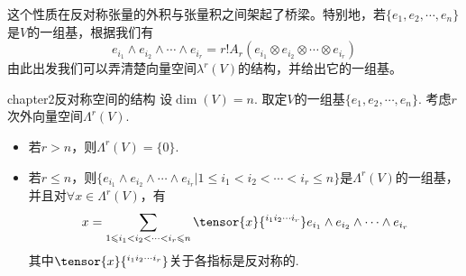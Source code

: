 这个性质在反对称张量的外积与张量积之间架起了桥梁。特别地，若$\{e_{1} ,e_{2},\cdots,e_{n}\}$是$V$的一组基，根据我们有
\begin{equation}
	e_{i_{1}}\wedge e_{i_{2}}\wedge \cdots\wedge e_{i_{r}}=r!A_{r}\left( e_{i_{1}}\otimes e_{i_{2}}\otimes\cdots\otimes e_{i_{r}}\right) 
	\label{1次外向量的外积与张量积}
\end{equation}
由此出发我们可以弄清楚向量空间$\lambda^{r}(V)$的结构，并给出它的一组基。
\begin{mythm}{}{chapter2反对称空间的结构}
	设$\operatorname{dim}(V)=n$. 取定$V$的一组基$\{e_{1} ,e_{2},\cdots,e_{n}\}$. 考虑$r$次外向量空间$\Lambda^{r}(V)$.
\begin{itemize}
\item[(1)] 若$r>n$，则$\Lambda^{r}(V)=\{0\}$.
\item[(2)] 若$r\leqslant n$，则$\{e_{i_{1}}\wedge e_{i_{2}}\wedge \cdots\wedge e_{i_{r}} | 1\leqslant i_{1}<i_{2}<\cdots<i_{r}\leqslant n \}$是$\Lambda^{r}(V)$的一组基，并且对$\forall x\in \Lambda^{r}(V)$，有
\[
x=\sum_{1\leqslant i_{1}<i_{2}<\cdots<i_{r}\leqslant n}\tensor{x}{^{i_{1}i_{2}\cdots i_{r}}}e_{i_{1}}\wedge e_{i_{2}}\wedge \cdots\wedge e_{i_{r}}
\]
其中$\tensor{x}{^{i_{1}i_{2}\cdots i_{r}}}$关于各指标是反对称的.
\end{itemize}
\end{mythm}
